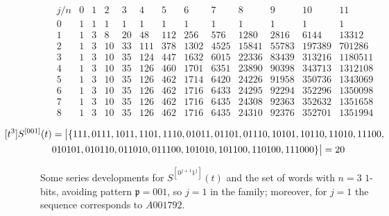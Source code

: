 \begin{table}
\begin{equation*}\begin{array}{c|cccccccccccc}j/n & 0 & 1 & 2 & 3 & 4 & 5 & 6 & 7 & 8 & 9 & 10 & 11\\\hline0 & 1 & 1 & 1 & 1 & 1 & 1 & 1 & 1 & 1 & 1 & 1 & 1\\1 & 1 & 3 & 8 & 20 & 48 & 112 & 256 & 576 & 1280 & 2816 & 6144 & 13312\\2 & 1 & 3 & 10 & 33 & 111 & 378 & 1302 & 4525 & 15841 & 55783 & 197389 & 701286\\3 & 1 & 3 & 10 & 35 & 124 & 447 & 1632 & 6015 & 22336 & 83439 & 313216 & 1180511\\4 & 1 & 3 & 10 & 35 & 126 & 460 & 1701 & 6351 & 23890 & 90398 & 343713 & 1312108\\5 & 1 & 3 & 10 & 35 & 126 & 462 & 1714 & 6420 & 24226 & 91958 & 350736 & 1343069\\6 & 1 & 3 & 10 & 35 & 126 & 462 & 1716 & 6433 & 24295 & 92294 & 352296 & 1350098\\7 & 1 & 3 & 10 & 35 & 126 & 462 & 1716 & 6435 & 24308 & 92363 & 352632 & 1351658\\8 & 1 & 3 & 10 & 35 & 126 & 462 & 1716 & 6435 & 24310 & 92376 & 352701 & 1351994\end{array}\end{equation*}

\begin{displaymath}
    \hspace{-1.5cm}
    \begin{split}
    [t^{3}]S^{[001]}(t) &= \big|\lbrace 111, 0111, 1011, 1101, 1110, 01011, 01101, 01110, 10101, 10110, 11010, 11100,\\
    & 010101, 010110, 011010, 011100, 101010, 101100, 110100, 111000\rbrace\big| = 20
    \end{split}
\end{displaymath}

\caption{Some series developments for $S^{[0^{j+1}1^j]}(t)$ and the set of
words with $n=3$ $1$-bits, avoiding pattern $\mathfrak{p}=001$, so $j=1$ in the
family; moreover, for $j=1$ the sequence corresponds to $A001792$.}
\label{tbl:S0_j1:1_j}
\end{table}

